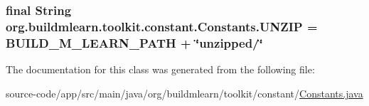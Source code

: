 \subsubsection[{\texorpdfstring{U\+N\+Z\+IP}{UNZIP}}]{\setlength{\rightskip}{0pt plus 5cm}final String org.\+buildmlearn.\+toolkit.\+constant.\+Constants.\+U\+N\+Z\+IP = {\bf B\+U\+I\+L\+D\+\_\+\+M\+\_\+\+L\+E\+A\+R\+N\+\_\+\+P\+A\+TH} + \char`\"{}unzipped/\char`\"{}\hspace{0.3cm}{\ttfamily [static]}}\hypertarget{classorg_1_1buildmlearn_1_1toolkit_1_1constant_1_1Constants_aa7187aa1863aeed8b73d71e3d203fe3c}{}\label{classorg_1_1buildmlearn_1_1toolkit_1_1constant_1_1Constants_aa7187aa1863aeed8b73d71e3d203fe3c}


The documentation for this class was generated from the following file\+:\begin{DoxyCompactItemize}
\item 
source-\/code/app/src/main/java/org/buildmlearn/toolkit/constant/\hyperlink{constant_2Constants_8java}{Constants.\+java}\end{DoxyCompactItemize}
